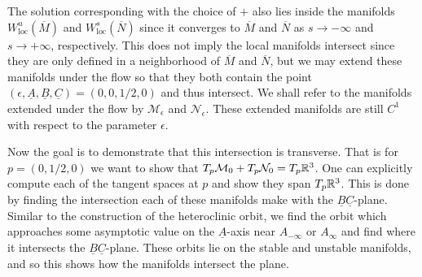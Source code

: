 The solution corresponding with the choice of \(+\) also lies inside the manifolds \(W^u_{\mathrm{loc}}(\overline M)\) and \(W^s_{\mathrm{loc}}(\overline N)\) since it converges to \(\overline M\) and \(\overline N\) as \(s\to - \infty \) and \(s\to +\infty\), respectively. This does not imply the local manifolds intersect since they are only defined in a neighborhood of \(\overline M\) and \(\overline N\), but we may extend these manifolds under the flow so that they both contain the point \((\epsilon , \underline A, \underline B, \underline C) = (0, 0, 1/2, 0)\) and thus intersect. We shall refer to the manifolds extended under the flow by \(\mathcal M_\epsilon\) and \(\mathcal N_\epsilon\). These extended manifolds are still \(C^1\) with respect to the parameter \(\epsilon\).

Now the goal is to demonstrate that this intersection is transverse. That is for \(p = (0,1/2,0)\) we want to show that \(T_p\mathcal M_0 + T_p \mathcal N_0 = T_p \mathbb{R}^3\). One can explicitly compute each of the tangent spaces at \(p\) and show they span \(T_p\mathbb{R}^3\). This is done by finding the intersection each of these manifolds make with the \(\underline B\underline C\)-plane. Similar to the construction of the heteroclinic orbit, we find the orbit which approaches some asymptotic value on the \(\underline A\)-axis near \(A_{-\infty}\) or \(A_{\infty}\) and find where it intersects the \(\underline B\underline C\)-plane. These orbits lie on the stable and unstable manifolds, and so this shows how the manifolds intersect the plane.

